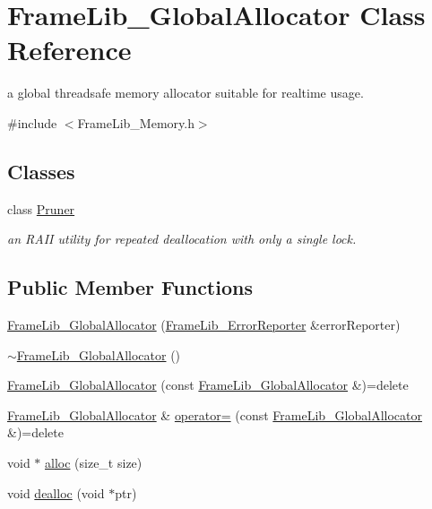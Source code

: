\hypertarget{class_frame_lib___global_allocator}{}\section{Frame\+Lib\+\_\+\+Global\+Allocator Class Reference}
\label{class_frame_lib___global_allocator}


a global threadsafe memory allocator suitable for realtime usage.  




{\ttfamily \#include $<$Frame\+Lib\+\_\+\+Memory.\+h$>$}

\subsection*{Classes}
\begin{DoxyCompactItemize}
\item 
class \hyperlink{class_frame_lib___global_allocator_1_1_pruner}{Pruner}
\begin{DoxyCompactList}\small\item\em an R\+A\+II utility for repeated deallocation with only a single lock. \end{DoxyCompactList}\end{DoxyCompactItemize}
\subsection*{Public Member Functions}
\begin{DoxyCompactItemize}
\item 
\hyperlink{class_frame_lib___global_allocator_aeb0d7259cd6bb4c5b8e365a26e370e54}{Frame\+Lib\+\_\+\+Global\+Allocator} (\hyperlink{class_frame_lib___error_reporter}{Frame\+Lib\+\_\+\+Error\+Reporter} \&error\+Reporter)
\item 
\hyperlink{class_frame_lib___global_allocator_a20fa9b3b84bb54eefffb8f30a70883d5}{$\sim$\+Frame\+Lib\+\_\+\+Global\+Allocator} ()
\item 
\hyperlink{class_frame_lib___global_allocator_a7e93abd711eb6acf04601aef3c6b9877}{Frame\+Lib\+\_\+\+Global\+Allocator} (const \hyperlink{class_frame_lib___global_allocator}{Frame\+Lib\+\_\+\+Global\+Allocator} \&)=delete
\item 
\hyperlink{class_frame_lib___global_allocator}{Frame\+Lib\+\_\+\+Global\+Allocator} \& \hyperlink{class_frame_lib___global_allocator_a23d4689821a194c5f89227d135a5703c}{operator=} (const \hyperlink{class_frame_lib___global_allocator}{Frame\+Lib\+\_\+\+Global\+Allocator} \&)=delete
\item 
void $\ast$ \hyperlink{class_frame_lib___global_allocator_af2ef32b9cba8f46c836be2d1df31d8a4}{alloc} (size\+\_\+t size)
\item 
void \hyperlink{class_frame_lib___global_allocator_a8cd36632acf1f6f281f50337bb95e2be}{dealloc} (void $\ast$ptr)
\end{DoxyCompactItemize}
